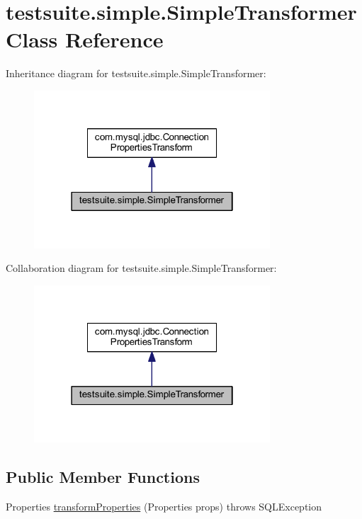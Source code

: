 \hypertarget{classtestsuite_1_1simple_1_1_simple_transformer}{}\section{testsuite.\+simple.\+Simple\+Transformer Class Reference}
\label{classtestsuite_1_1simple_1_1_simple_transformer}


Inheritance diagram for testsuite.\+simple.\+Simple\+Transformer\+:
\nopagebreak
\begin{figure}[H]
\begin{center}
\leavevmode
\includegraphics[width=250pt]{classtestsuite_1_1simple_1_1_simple_transformer__inherit__graph}
\end{center}
\end{figure}


Collaboration diagram for testsuite.\+simple.\+Simple\+Transformer\+:
\nopagebreak
\begin{figure}[H]
\begin{center}
\leavevmode
\includegraphics[width=250pt]{classtestsuite_1_1simple_1_1_simple_transformer__coll__graph}
\end{center}
\end{figure}
\subsection*{Public Member Functions}
\begin{DoxyCompactItemize}
\item 
Properties \mbox{\hyperlink{classtestsuite_1_1simple_1_1_simple_transformer_aadfc91d352f3a7b94257f30b319cb258}{transform\+Properties}} (Properties props)  throws S\+Q\+L\+Exception 
\end{DoxyCompactItemize}


